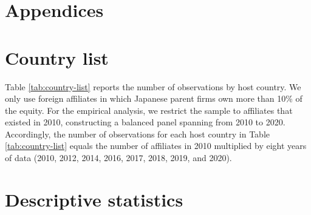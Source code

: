 \documentclass[preprint,11pt,authoryear]{elsarticle}
\begin{document}
%
%
%
%
%
%





\newpage
\appendix
\setcounter{table}{0}
\renewcommand{\tablename}{Appendix Table}
\renewcommand{\figurename}{Figure}
\renewcommand{\thetable}{A\arabic{table}}
\setcounter{figure}{0}
\renewcommand{\thefigure}{A\arabic{figure}}



\appendix
\newpage 
\section*{Appendices}


\section{Country list}\label{country}

Table \ref{tab:country-list} reports the number of observations by host country.
We only use foreign affiliates in which Japanese parent firms own more than 10\% of the equity.
For the empirical analysis, we restrict the sample to affiliates that existed in 2010, constructing a balanced panel spanning from 2010 to 2020.
Accordingly, the number of observations for each host country in Table \ref{tab:country-list} equals the number of affiliates in 2010 multiplied by eight years of data (2010, 2012, 2014, 2016, 2017, 2018, 2019, and 2020).

{\renewcommand\normalsize{\scriptsize}%
\normalsize 

}



\section{Descriptive statistics}\label{descriptive}
\end{document}
